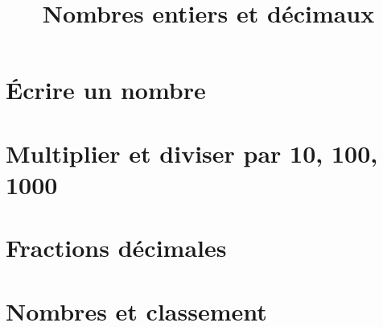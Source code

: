 \documentclass[12pt,a4paper]{article}
\date{}
\title{Nombres entiers et décimaux}
\begin{document}





\section{\'Ecrire un nombre}\label{sec:ecrire-un-nombre}



\newpage

\section{Multiplier et diviser par 10, 100, 1000}


%
%
\section{Fractions décimales}
%

%
\section{Nombres et classement}
%

\end{document}
